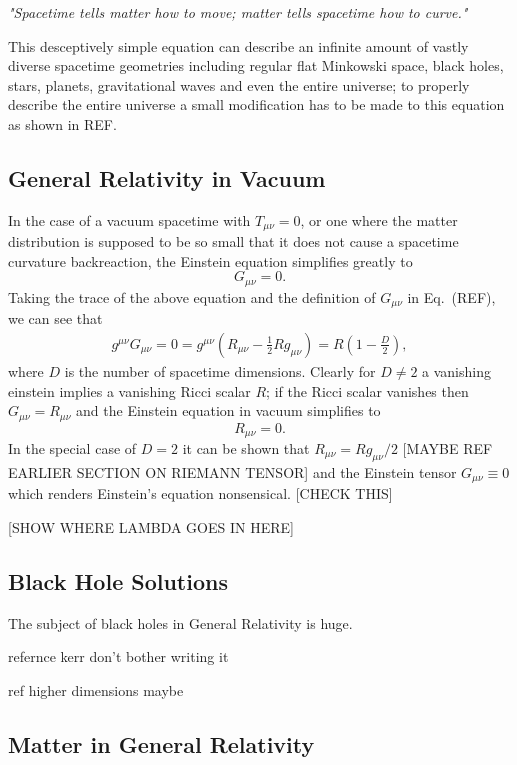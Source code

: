 {\it "Spacetime tells matter how to move; matter tells spacetime how to curve." } 


This desceptively simple equation can describe an infinite amount of vastly diverse spacetime geometries including regular flat Minkowski space, black holes, stars, planets, gravitational waves and even the entire universe; to properly describe the entire universe a small modification has to be made to this equation as shown in REF.



\subsection{General Relativity in Vacuum}

In the case of a vacuum spacetime with $T_{\mu\nu}=0$, or one where the matter distribution is supposed to be so small that it does not cause a spacetime curvature backreaction, the Einstein equation simplifies greatly to
\begin{equation}G_{\mu\nu}=0.\end{equation}
Taking the trace of the above equation and the definition of $G_{\mu\nu}$ in Eq.~(REF), we can see that 
\begin{align}
g^{\mu\nu}G_{\mu\nu}=0=g^{\mu\nu}(R_{\mu\nu}-\frac{1}{2}Rg_{\mu\nu}) = R(1-\frac{D}{2}),
\end{align}
where $D$ is the number of spacetime dimensions. Clearly for $D\neq 2$ a vanishing einstein implies a vanishing Ricci scalar $R$; if the Ricci scalar vanishes then $G_{\mu\nu}=R_{\mu\nu}$ and the Einstein equation in vacuum simplifies to 
\begin{equation}
R_{\mu\nu} = 0.
\end{equation}
In the special case of $D=2$ it can be shown that $R_{\mu\nu} = Rg_{\mu\nu}/2$ [MAYBE REF EARLIER SECTION ON RIEMANN TENSOR] and the Einstein tensor $G_{\mu\nu}\equiv 0$ which renders Einstein's equation nonsensical. [CHECK THIS]

[SHOW WHERE LAMBDA GOES IN HERE]


\subsection{Black Hole Solutions}
The subject of black holes in General Relativity is huge.

refernce kerr don't bother writing it

ref higher dimensions maybe


\subsection{Matter in General Relativity}


